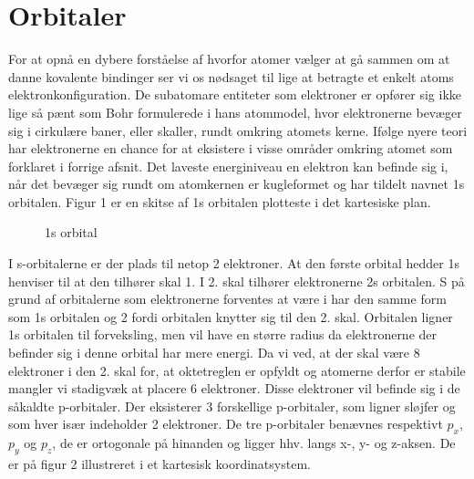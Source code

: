 \section{Orbitaler}
For at opnå en dybere forståelse af hvorfor atomer vælger at gå sammen om at danne kovalente bindinger ser vi os nødsaget til lige at betragte et enkelt atoms elektronkonfiguration. De subatomare entiteter som elektroner er opfører sig ikke lige så pænt som Bohr formulerede i hans atommodel, hvor elektronerne bevæger sig i cirkulære baner, eller skaller, rundt omkring atomets kerne. Ifølge nyere teori har elektronerne en chance for at eksistere i visse områder omkring atomet som forklaret i forrige afsnit. Det laveste energiniveau en elektron kan befinde sig i, når det bevæger sig rundt om atomkernen er kugleformet og har tildelt navnet 1s orbitalen. Figur 1 er en skitse af 1s orbitalen plotteste i det kartesiske plan. 

\begin{figure}[ht!]
  \centering
  \caption{1s orbital} 
  \end{figure}
  
  I s-orbitalerne er der plads til netop 2 elektroner. At den første orbital hedder 1s henviser til at den tilhører skal 1. I 2. skal tilhører elektronerne 2s orbitalen. S på grund af orbitalerne som elektronerne forventes at være i har den samme form som 1s orbitalen og 2 fordi orbitalen knytter sig til den 2. skal. Orbitalen ligner 1s orbitalen til forveksling, men vil have en større radius da elektronerne der befinder sig i denne orbital har mere energi. Da vi ved, at der skal være 8 elektroner i den 2. skal for, at oktetreglen er opfyldt og atomerne derfor er stabile mangler vi stadigvæk at placere 6 elektroner. Disse elektroner vil befinde sig i de såkaldte p-orbitaler. Der eksisterer 3 forskellige p-orbitaler, som ligner sløjfer og som hver især indeholder 2 elektroner. De tre p-orbitaler benævnes respektivt $p_x$, $p_y$ og $p_z$, de er ortogonale på hinanden og ligger hhv. langs x-, y- og z-aksen. De er på figur 2 illustreret i et kartesisk koordinatsystem.
  
